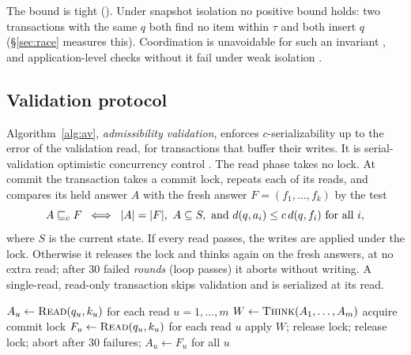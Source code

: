 \documentclass[sigconf, nonacm, review]{acmart}
\begin{document}
The bound is tight (\appProofs). Under snapshot isolation no positive
bound holds: two transactions with the same $q$ both find no item within
$\tau$ and both insert $q$ (\S\ref{sec:race} measures this). Coordination is unavoidable for
such an invariant \cite{DBLP:journals/pvldb/BailisFFGHS14}, and application-level checks without
it fail under weak isolation \cite{DBLP:conf/sigmod/BailisFFGHS15,DBLP:conf/sigmod/WarszawskiB17}.

\subsection{Validation protocol}
\label{sec:protocol}

Algorithm~\ref{alg:av}, \emph{admissibility validation}, enforces
$c$-serializability up to the error of the validation read, for
transactions that buffer their writes. It is serial-validation
optimistic concurrency control \cite{DBLP:journals/tods/KungR81}. The read phase takes no lock.
At commit the transaction takes a commit lock, repeats each of its
reads, and compares its held answer $A$ with the fresh answer
$F=(f_1,\dots,f_k)$ by the test
\[
A\sqsubseteq_c F \;\iff\; |A|=|F|,\ A\subseteq S,\ \text{and}\
d(q,a_i)\le c\,d(q,f_i)\ \text{for all } i,
\]
where $S$ is the current state. If every read passes, the writes are
applied under the lock. Otherwise it releases the lock and
thinks again on the fresh answers, at no extra read;
after 30 failed \emph{rounds} (loop passes) it aborts without writing. A single-read, read-only transaction skips validation and is
serialized at its read.

\begin{algorithm}[t]
\caption{Admissibility validation for one transaction $T$}
\label{alg:av}
\small
\begin{algorithmic}[1]
\State $A_u \gets \textsc{Read}(q_u,k_u)$ for each read $u=1,\dots,m$ 
\Loop
  \State $W \gets \textsc{Think}(A_1,\dots,A_m)$ 
  \If{$T$ is read-only and $m=1$} \Return \EndIf
  \State acquire commit lock
  \State $F_u \gets \textsc{Read}(q_u,k_u)$ for each read $u$
    \State apply $W$; release lock; \Return
  \EndIf
  \State release lock; abort after 30 failures; $A_u \gets F_u$ for all $u$
\EndLoop
\end{algorithmic}
\end{algorithm}
\end{document}
